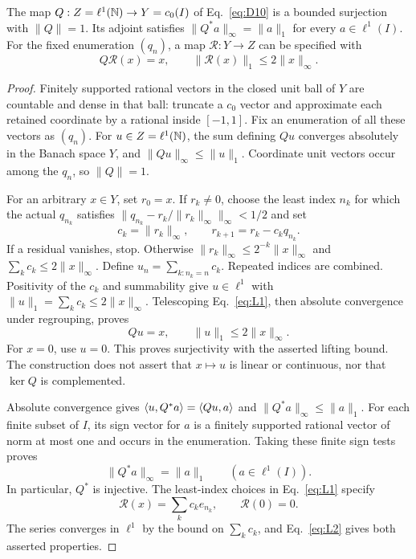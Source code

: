 \begin{lemma}
\label{lem:specified-quotient}
The map $Q:Z=\ell^1(\mathbb N)\to Y=c_0(I)$ of Eq.~\eqref{eq:D10} is a
bounded surjection with $\|Q\|=1$. Its adjoint satisfies
$\|Q^*a\|_\infty=\|a\|_1$ for every $a\in\ell^1(I)$.
For the fixed enumeration $(q_n)$, a map $\mathcal R:Y\to Z$ can be
specified with
\[
Q\mathcal R(x)=x,\qquad \|\mathcal R(x)\|_1\le2\|x\|_\infty.
\]
\end{lemma}
\begin{proof}
\label{sec:L1}
Finitely supported rational vectors in the closed unit ball of $Y$ are
countable and dense in that ball: truncate a $c_0$ vector and approximate
each retained coordinate by a rational inside $[-1,1]$. Fix an enumeration
of all these vectors as $(q_n)$. For $u\in Z=\ell^1(\mathbb N)$, the sum defining
$Qu$ converges absolutely in the Banach space $Y$, and
$\|Qu\|_\infty\le\|u\|_1$. Coordinate unit vectors occur among the $q_n$,
so $\|Q\|=1$.

For an arbitrary $x\in Y$, set $r_0=x$. If $r_k\ne0$, choose the least index $n_k$ for which the actual
$q_{n_k}$ satisfies $\|q_{n_k}-r_k/\|r_k\|_\infty\|_\infty<1/2$ and set
\begin{equation}
c_k=\|r_k\|_\infty,\qquad r_{k+1}=r_k-c_kq_{n_k}.
\label{eq:L1}
\end{equation}
If a residual vanishes, stop. Otherwise
$\|r_k\|_\infty\le2^{-k}\|x\|_\infty$ and $\sum_k c_k\le2\|x\|_\infty$.
Define $u_n=\sum_{k:n_k=n}c_k$. Repeated indices are combined.
Positivity of the $c_k$ and summability give $u\in\ell^1$ with
$\|u\|_1=\sum_k c_k\le2\|x\|_\infty$.
Telescoping Eq.~\eqref{eq:L1}, then absolute convergence under regrouping,
proves
\begin{equation}
Qu=x,\qquad \|u\|_1\le2\|x\|_\infty.
\label{eq:L2}
\end{equation}
For $x=0$, use $u=0$. This proves surjectivity with the asserted lifting
bound. The construction does not assert that $x\mapsto u$ is linear or
continuous, nor that $\ker Q$ is complemented.

\label{sec:L2}
Absolute convergence gives $\langle u,Q^*a\rangle=\langle Qu,a\rangle$ and
$\|Q^*a\|_\infty\le\|a\|_1$. For each finite subset of $I$, its sign
vector for $a$ is a finitely supported rational vector of norm at most
one and occurs in the enumeration. Taking these finite sign tests proves
\begin{equation}
\|Q^*a\|_\infty=\|a\|_1\qquad(a\in\ell^1(I)).
\label{eq:L3}
\end{equation}
In particular, $Q^*$ is injective. The least-index choices in
Eq.~\eqref{eq:L1} specify
\[
\mathcal R(x)=\sum_k c_k e_{n_k},\qquad \mathcal R(0)=0.
\]
The series converges in $\ell^1$ by the bound on $\sum_k c_k$,
and Eq.~\eqref{eq:L2} gives both asserted properties.
\end{proof}

